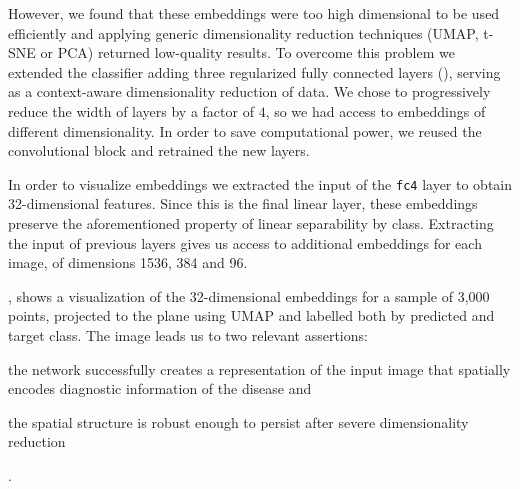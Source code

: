 However, we found that these embeddings were too high dimensional to be used efficiently and applying generic dimensionality reduction techniques (UMAP, t-SNE or PCA) returned low-quality results. To overcome this problem we extended the classifier adding three regularized fully connected layers (), serving as a context-aware dimensionality reduction of data. We chose to progressively reduce the width of layers by a factor of \( 4 \), so we had access to embeddings of different dimensionality. In order to save computational power, we reused the convolutional block and retrained the new layers.

In order to visualize embeddings we extracted the input of the \texttt{fc4} layer to obtain 32-dimensional features. Since this is the final linear layer,  these embeddings preserve the aforementioned property of linear separability by class. Extracting the input of previous layers gives us access to additional embeddings for each image, of dimensions 1536, 384 and 96. 

, shows a visualization of the 32-dimensional embeddings for a sample of 3,000 points, projected to the plane using UMAP \cite{mcinnes2018umap} and labelled both by predicted and target class. The image leads us to two relevant assertions: \begin{enumerate*}[label=(\arabic*)]
\item the network successfully creates a representation of the input image that spatially encodes diagnostic information of the disease and \item the spatial structure is robust enough to persist after severe dimensionality reduction\end{enumerate*}. 

